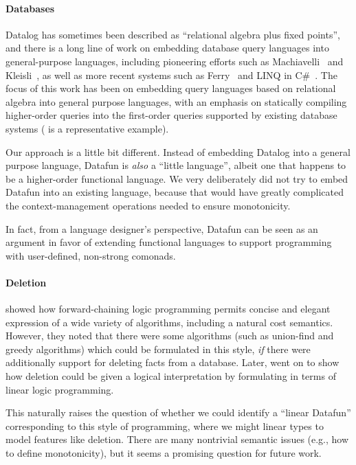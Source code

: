 \paragraph{Databases} Datalog has sometimes been described
as ``relational algebra plus fixed points'', and there is a long line
of work on embedding database query languages into general-purpose
languages, including pioneering efforts such as
Machiavelli~\cite{machiavelli} and Kleisli~\cite{kleisli}, as well as
more recent systems such as Ferry~\cite{ferry} and LINQ in C\#~\cite{linq-wadler}.
%
The focus of this work has been on embedding query languages based
on relational algebra into general purpose languages, with an emphasis
on statically compiling higher-order queries into the first-order
queries supported by existing database systems (\citet{query-shredding} is a
representative example).

Our approach is a little bit different. Instead of embedding Datalog
into a general purpose language, Datafun is \emph{also} a ``little
language'', albeit one that happens to be a higher-order
functional language. We very deliberately did not try to embed Datafun
into an existing language, because that would have greatly complicated
the context-management operations needed to ensure monotonicity.

In fact, from a language designer's perspective, Datafun can be seen
as an argument in favor of extending functional languages to support
programming with user-defined, non-strong comonads.

\paragraph{Deletion} \citet{logical-algorithms} showed how
forward-chaining logic programming permits concise and elegant
expression of a wide variety of algorithms, including a natural cost
semantics. However, they noted that there were some algorithms (such
as union-find and greedy algorithms) which could be formulated in this
style, \emph{if} there were additionally support for deleting facts
from a database. Later, \citet{linear-logical-algorithms} went on to
show how deletion could be given a logical interpretation by
formulating in terms of linear logic programming.

This naturally raises the question of whether we could identify a
``linear Datafun'' corresponding to this style of programming, where
we might linear types to model features like deletion. There are many
nontrivial semantic issues (e.g., how to define monotonicity), but
it seems a promising question for future work.

